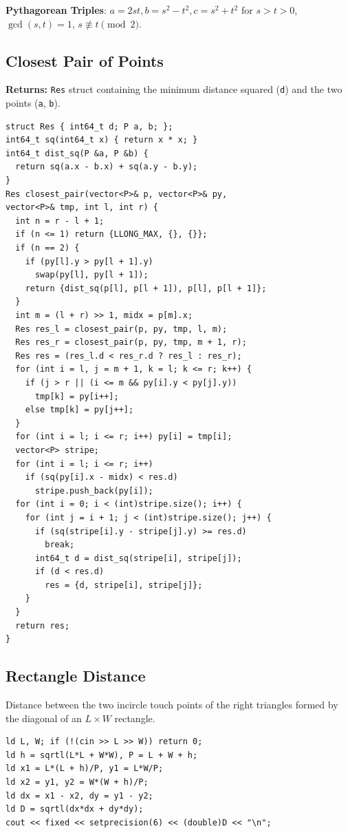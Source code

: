 \textbf{Pythagorean Triples}: $a = 2st, b = s^2-t^2, c = s^2+t^2$ for $s>t>0$, $\gcd(s,t)=1$, $s \not\equiv t \pmod 2$.

\subsection{Closest Pair of Points}
\textbf{Returns:} \texttt{Res} struct containing the minimum distance squared (\texttt{d}) and the two points (\texttt{a}, \texttt{b}).
\begin{verbatim}
struct Res { int64_t d; P a, b; };
int64_t sq(int64_t x) { return x * x; }
int64_t dist_sq(P &a, P &b) {
  return sq(a.x - b.x) + sq(a.y - b.y);
}
Res closest_pair(vector<P>& p, vector<P>& py,
vector<P>& tmp, int l, int r) {
  int n = r - l + 1;
  if (n <= 1) return {LLONG_MAX, {}, {}};
  if (n == 2) {
    if (py[l].y > py[l + 1].y)
      swap(py[l], py[l + 1]);
    return {dist_sq(p[l], p[l + 1]), p[l], p[l + 1]};
  }
  int m = (l + r) >> 1, midx = p[m].x;
  Res res_l = closest_pair(p, py, tmp, l, m);
  Res res_r = closest_pair(p, py, tmp, m + 1, r);
  Res res = (res_l.d < res_r.d ? res_l : res_r);
  for (int i = l, j = m + 1, k = l; k <= r; k++) {
    if (j > r || (i <= m && py[i].y < py[j].y))
      tmp[k] = py[i++];
    else tmp[k] = py[j++];
  }
  for (int i = l; i <= r; i++) py[i] = tmp[i];
  vector<P> stripe;
  for (int i = l; i <= r; i++)
    if (sq(py[i].x - midx) < res.d)
      stripe.push_back(py[i]);
  for (int i = 0; i < (int)stripe.size(); i++) {
    for (int j = i + 1; j < (int)stripe.size(); j++) {
      if (sq(stripe[i].y - stripe[j].y) >= res.d)
        break;
      int64_t d = dist_sq(stripe[i], stripe[j]);
      if (d < res.d)
        res = {d, stripe[i], stripe[j]};
    }
  }
  return res;
}
\end{verbatim}
\subsection{Rectangle Distance}
Distance between the two incircle touch points of the right triangles formed by the diagonal of an $L \times W$ rectangle.
\begin{verbatim}
ld L, W; if (!(cin >> L >> W)) return 0;
ld h = sqrtl(L*L + W*W), P = L + W + h;
ld x1 = L*(L + h)/P, y1 = L*W/P;
ld x2 = y1, y2 = W*(W + h)/P;
ld dx = x1 - x2, dy = y1 - y2;
ld D = sqrtl(dx*dx + dy*dy);
cout << fixed << setprecision(6) << (double)D << "\n";
\end{verbatim}
